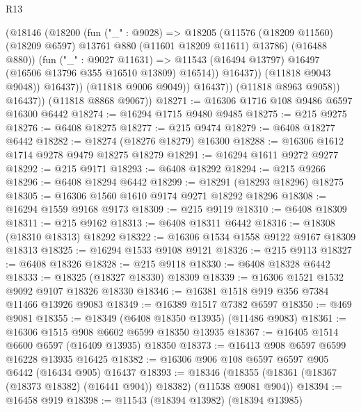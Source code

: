 \begin{lexlean}{R13}
\begin{coremodule}
                          (@18146
                            (@18200
                              (fun ("_" : @9028) =>
                              @18205
                                (@11576
                                  (@18209 @11560)
                                  (@18209 @6597)
                                  @13761
                                  @880
                                  (@11601 @18209 @11611)
                                  @13786)
                                (@16488 @880))
                              (fun ("_" : @9027 @11631) =>
                              @11543
                                (@16494 @13797)
                                @16497
                                (@16506 @13796 @355 @16510 @13809)
                                @16514))
                            @16437))
                        (@11818 @9043 @9048))
                      @16437))
                  (@11818 @9006 @9049))
                @16437))
            (@11818 @8963 @9058))
          @16437))
      (@11818 @8868 @9067))
@18271 := @16306 @1716 @108 @9486 @6597 @16300 @6442
@18274 := @16294 @1715 @9480 @9485
@18275 := @215 @9275
@18276 := @6408 @18275
@18277 := @215 @9474
@18279 := @6408 @18277 @6442
@18282 := @18274 (@18276 @18279) @16300
@18288 := @16306 @1612 @1714 @9278 @9479 @18275 @18279
@18291 := @16294 @1611 @9272 @9277
@18292 := @215 @9171
@18293 := @6408 @18292
@18294 := @215 @9266
@18296 := @6408 @18294 @6442
@18299 := @18291 (@18293 @18296) @18275
@18305 := @16306 @1560 @1610 @9174 @9271 @18292 @18296
@18308 := @16294 @1559 @9168 @9173
@18309 := @215 @9119
@18310 := @6408 @18309
@18311 := @215 @9162
@18313 := @6408 @18311 @6442
@18316 := @18308 (@18310 @18313) @18292
@18322 := @16306 @1534 @1558 @9122 @9167 @18309 @18313
@18325 := @16294 @1533 @9108 @9121
@18326 := @215 @9113
@18327 := @6408 @18326
@18328 := @215 @9118
@18330 := @6408 @18328 @6442
@18333 := @18325 (@18327 @18330) @18309
@18339 := @16306 @1521 @1532 @9092 @9107 @18326 @18330
@18346 := @16381 @1518 @919 @356 @7384 @11466 @13926 @9083
@18349 := @16389 @1517 @7382 @6597
@18350 := @469 @9081
@18355 := @18349 (@6408 @18350 @13935) (@11486 @9083)
@18361 := @16306 @1515 @908 @6602 @6599 @18350 @13935
@18367 := @16405 @1514 @6600 @6597 (@16409 @13935) @18350
@18373 := @16413 @908 @6597 @6599 @16228 @13935 @16425
@18382 := @16306 @906 @108 @6597 @6597 @905 @6442 (@16434 @905) @16437
@18393 := @18346 (@18355 (@18361 (@18367 (@18373 @18382) (@16441 @904)) @18382) (@11538 @9081 @904))
@18394 := @16458 @919
@18398 := @11543 (@18394 @13982) (@18394 @13985)

\end{coremodule}
\end{lexlean}

